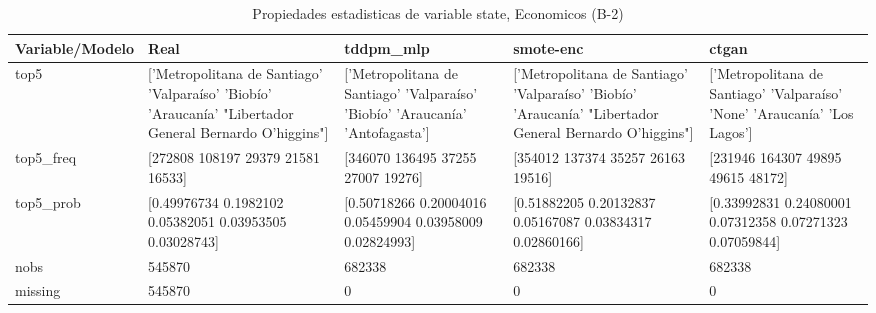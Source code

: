 \begin{table}[H]
\centering
\fontsize{8}{14}\selectfont
\caption{Propiedades  estadisticas de variable state, Economicos (B-2)}
\label{table-stats-economicos-b-2-state}
\begin{tabular}{|l|m{10em}|m{10em}|m{10em}|m{10em}|}
\hline
 \rowcolor[gray]{0.8}
Variable/Modelo & Real & tddpm\_mlp & smote-enc & ctgan \\
\hline top5 & ['Metropolitana de Santiago' 'Valparaíso' 'Biobío' 'Araucanía'
 "Libertador General Bernardo O'higgins"] & ['Metropolitana de Santiago' 'Valparaíso' 'Biobío' 'Araucanía'
 'Antofagasta'] & ['Metropolitana de Santiago' 'Valparaíso' 'Biobío' 'Araucanía'
 "Libertador General Bernardo O'higgins"] & ['Metropolitana de Santiago' 'Valparaíso' 'None' 'Araucanía' 'Los Lagos'] \\
\hline top5\_freq & [272808 108197  29379  21581  16533] & [346070 136495  37255  27007  19276] & [354012 137374  35257  26163  19516] & [231946 164307  49895  49615  48172] \\
\hline top5\_prob & [0.49976734 0.1982102  0.05382051 0.03953505 0.03028743] & [0.50718266 0.20004016 0.05459904 0.03958009 0.02824993] & [0.51882205 0.20132837 0.05167087 0.03834317 0.02860166] & [0.33992831 0.24080001 0.07312358 0.07271323 0.07059844] \\
\hline nobs & 545870 & 682338 & 682338 & 682338 \\
\hline missing & 545870 & 0 & 0 & 0 \\
\hline
\end{tabular}
\end{table}
